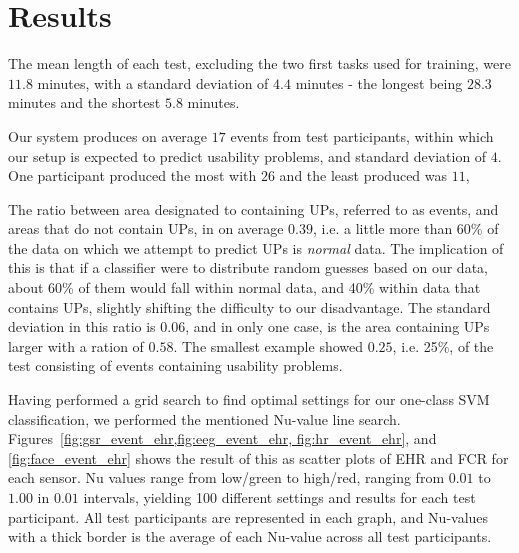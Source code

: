 \section{Results}
The mean length of each test, excluding the two first tasks used for training, were $11.8$ minutes, with a standard
deviation of $4.4$ minutes - the longest being $28.3$ minutes and the shortest $5.8$ minutes.

Our system produces on average $17$ events from test participants, within which our setup is expected to predict
usability problems, and standard deviation of $4$. One participant produced the most with $26$ and the least produced
was $11$,

The ratio between area designated to containing UPs, referred to as events, and areas that do not contain UPs, in on
average $0.39$, i.e. a little more than 60\% of the data on which we attempt to predict UPs is \textit{normal} data. The
implication of this is that if a classifier were to distribute random guesses based on our data, about 60\% of them
would fall within normal data, and 40\% within data that contains UPs, slightly shifting the difficulty to our
disadvantage. The standard deviation in this ratio is $0.06$, and in only one case, is the area containing UPs larger
with a ration of $0.58$. The smallest example showed $0.25$, i.e. 25\%, of the test consisting of events containing
usability problems.



Having performed a grid search to find optimal settings for our one-class SVM classification, we performed the mentioned
Nu-value line search. Figures~\ref{fig:gsr_event_ehr,fig:eeg_event_ehr, fig:hr_event_ehr}, and \ref{fig:face_event_ehr}
shows the result of this as scatter plots of EHR and FCR for each sensor. Nu values range from low/green to high/red,
ranging from $0.01$ to $1.00$ in $0.01$ intervals, yielding 100 different settings and results for each test
participant. All test participants are represented in each graph, and Nu-values with a thick border is the average of
each Nu-value across all test participants.

